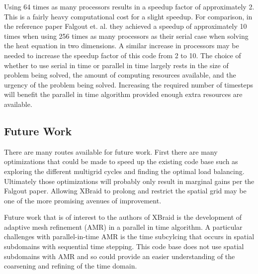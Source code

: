 \documentclass{article}
\begin{document}
Using 64 times as many processors results in a speedup factor of
approximately 2. This is a fairly heavy computational cost for a slight
speedup. For comparison, in the reference paper Falgout et. al. they
achieved a speedup of approximately 10 times when using 256 times as
many processors as their serial case when solving the heat equation in
two dimensions. A similar increase in processors may be needed to
increase the speedup factor of this code from 2 to 10. The choice of
whether to use serial in time or parallel in time largely rests in the
size of problem being solved, the amount of computing resources
available, and the urgency of the problem being solved.
Increasing the required number of timesteps will benefit the parallel in time algorithm provided enough extra resources are available.

\subsection{Future Work}\label{future-work}

There are many routes available for future work. First there are many
optimizations that could be made to speed up the existing code base such
as exploring the different multigrid cycles and finding the optimal load
balancing. Ultimately those optimizations will probably only result in
marginal gains per the Falgout paper. Allowing XBraid to prolong and
restrict the spatial grid may be one of the more promising avenues of
improvement.

Future work that is of interest to the authors of XBraid is the
development of adaptive mesh refinement (AMR) in a parallel in time
algorithm. A particular challenges with parallel-in-time AMR is the time
subcylcing that occurs in spatial subdomains with sequential time
stepping. This code base does not use spatial subdomains with AMR and so
could provide an easier understanding of the coarsening and refining of
the time domain.
\end{document}
